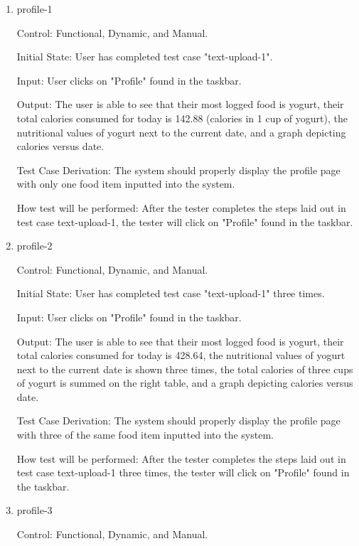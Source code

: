 \documentclass[12pt, titlepage]{article}
\begin{document}
	\begin{enumerate}
		\item{profile-1\\}
		
		Control: Functional, Dynamic, and Manual.
		
		Initial State: User has completed test case "text-upload-1".
		
		Input: User clicks on "Profile" found in the taskbar.
		
		Output: The user is able to see that their most logged food is yogurt, their total calories consumed for today is 142.88 (calories in 1 cup of yogurt), the nutritional values of yogurt next to the current date, and a graph depicting calories versus date.
		
		Test Case Derivation: The system should properly display the profile page with only one food item inputted into the system.
		
		How test will be performed: After the tester completes the steps laid out in test case text-upload-1, the tester will click on "Profile" found in the taskbar.
		
		\item{profile-2\\}
		
		Control: Functional, Dynamic, and Manual.
		
		Initial State: User has completed test case "text-upload-1" three times.
		
		Input: User clicks on "Profile" found in the taskbar.
		
		Output: The user is able to see that their most logged food is yogurt, their total calories consumed for today is 428.64, the nutritional values of yogurt next to the current date is shown three times, the total calories of three cups of yogurt is summed on the right table, and a graph depicting calories versus date.
		
		Test Case Derivation: The system should properly display the profile page with three of the same food item inputted into the system.
		
		How test will be performed: After the tester completes the steps laid out in test case text-upload-1 three times, the tester will click on "Profile" found in the taskbar.
		
		\item{profile-3\\}
		
		Control: Functional, Dynamic, and Manual.
		

\end{enumerate}
\end{document}
